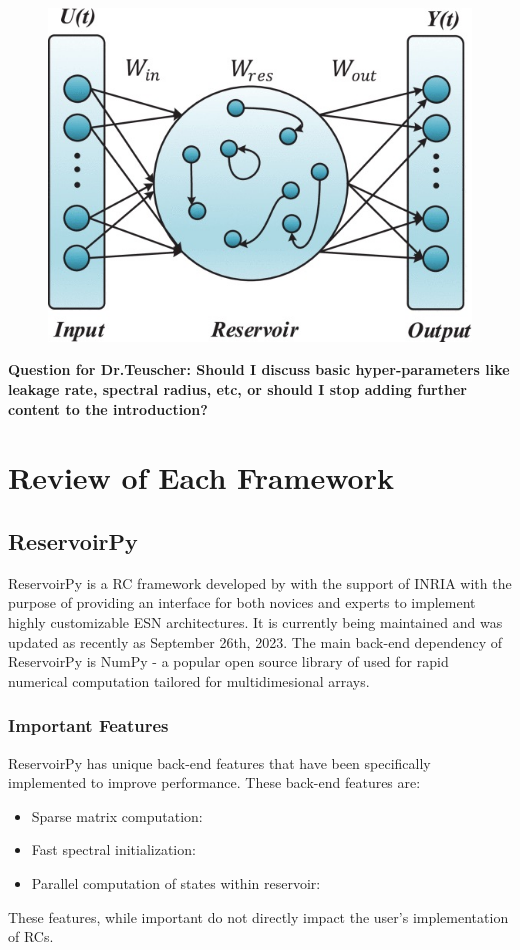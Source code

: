 \documentclass[a4paper,fleqn]{cas-dc}
\begin{document}
\begin{figure}[h!]
    \centering
    \includegraphics[scale=0.25]{figs/ESN_im.jpeg}
    \caption{\citep{zheng2020long}}
    
    \label{fig:enter-label}
\end{figure}

\textbf{Question for Dr.Teuscher: Should I discuss basic hyper-parameters like leakage rate, spectral radius, etc, or should I stop adding further content to the introduction?}






\section{Review of Each Framework}
\subsection{ReservoirPy}
ReservoirPy is a RC framework developed by \cite{Trouvain2020} with the support of INRIA with the purpose of providing an interface for both novices and experts to implement highly customizable ESN architectures. It is currently being maintained and was updated as recently as September 26th, 2023. The main back-end dependency of ReservoirPy is NumPy - a popular open source library of used for rapid numerical computation tailored for multidimesional arrays. 
\subsubsection{Important Features}
ReservoirPy has unique back-end features that have been specifically implemented to improve performance. These back-end features are:
\begin{itemize}
  \item Sparse matrix computation:  
  \item Fast spectral initialization:
  \item Parallel computation of states within reservoir:
\end{itemize}
These features, while important do not directly impact the user's implementation of RCs.
\end{document}
